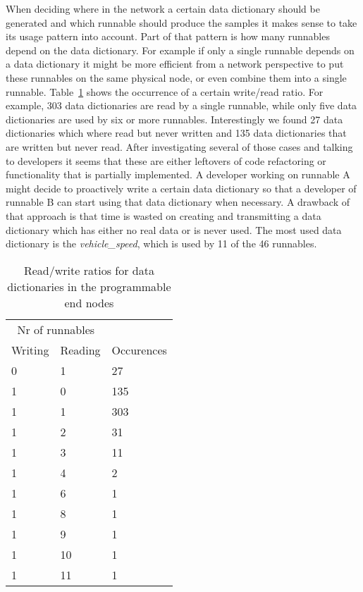 When deciding where in the network a certain data dictionary should be generated and which runnable should produce the samples it makes sense to take its usage pattern into account. Part of that pattern is how many runnables depend on the data dictionary. For example if only a single runnable depends on a data dictionary it might be more efficient from a network perspective to put these runnables on the same physical node, or even combine them into a single runnable. Table~\ref{tab:prog_nodes_read_write} shows the occurrence of a certain write/read ratio. For example, 303 data dictionaries are read by a single runnable, while only five data dictionaries are used by six or more runnables. Interestingly we found 27 data dictionaries which where read but never written and 135 data dictionaries that are written but never read. After investigating several of those cases and talking to developers it seems that these are either leftovers of code refactoring or functionality that is partially implemented. A developer working on runnable A might decide to proactively write a certain data dictionary so that a developer of runnable B can start using that data dictionary when necessary. A drawback of that approach is that time is wasted on creating and transmitting a data dictionary which has either no real data or is never used. The most used data dictionary is the \textit{vehicle\_speed}, which is used by 11 of the 46 runnables.
\begin{table}[htb]
    \centering
    \begin{tabular}{@{}lll@{}}
    \toprule
    \multicolumn{2}{c}{Nr of runnables} & \\
    Writing & Reading & Occurences \\ \midrule
    0       & 1      & 27         \\
    1       & 0      & 135        \\
    1       & 1      & 303        \\
    1       & 2      & 31         \\
    1       & 3      & 11         \\
    1       & 4      & 2          \\
    1       & 6      & 1          \\
    1       & 8      & 1          \\
    1       & 9      & 1          \\
    1       & 10     & 1          \\
    1       & 11     & 1          \\ \bottomrule
    \end{tabular}
    \caption{Read/write ratios for data dictionaries in the programmable end nodes}
    \label{tab:prog_nodes_read_write}
\end{table}

